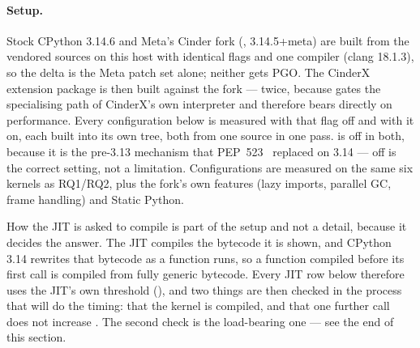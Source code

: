 
\paragraph{Setup.} Stock CPython 3.14.6 and Meta's Cinder fork (,
3.14.5+meta) are built from the vendored sources on this host with identical 
flags and one compiler (clang 18.1.3), so the delta is the Meta patch set alone; neither gets
PGO. The CinderX extension package is then built against the fork --- twice, because
 gates the specialising path of CinderX's own
interpreter and therefore bears directly on performance. Every configuration below is measured
with that flag off and with it on, each built into its own tree, both from one source in one
pass.  is off in both, because
it is the pre-3.13 mechanism that PEP~523~\cite{pep523} replaced on 3.14 --- off is the correct setting, not
a limitation. Configurations are measured on the same six kernels as RQ1/RQ2, plus the fork's
own features (lazy imports, parallel GC, frame handling) and Static Python.

How the JIT is asked to compile is part of the setup and not a detail, because it decides the
answer. The JIT compiles the bytecode it is shown, and CPython 3.14 rewrites that bytecode as a
function runs, so a function compiled before its first call is compiled from fully generic
bytecode. Every JIT row below therefore uses the JIT's own threshold
(), and two things are then checked in the process that will do
the timing: that the kernel is compiled, and that one further call does not increase
. The second check is the load-bearing one --- see the end of
this section.

